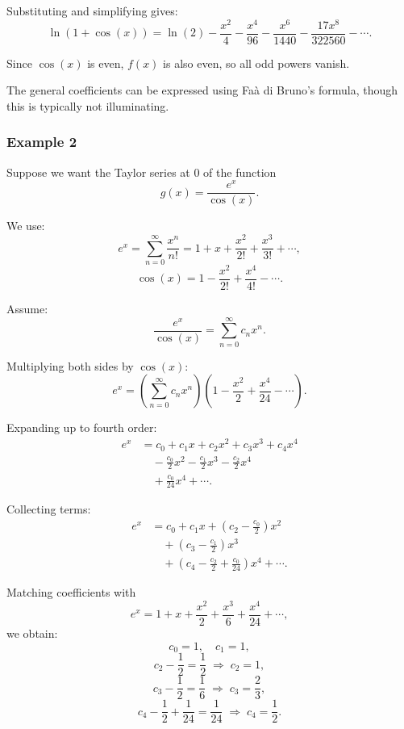 Substituting and simplifying gives:
\[
\ln(1+\cos(x))
= \ln(2)
- \frac{x^2}{4}
- \frac{x^4}{96}
- \frac{x^6}{1440}
- \frac{17x^8}{322560}
- \cdots.
\]

\medskip

Since $\cos(x)$ is even, $f(x)$ is also even, so all odd powers vanish.

\medskip

The general coefficients can be expressed using Faà di Bruno's formula, though this is typically not illuminating.

\subsubsection{Example 2}
\label{sss:exam-5bdd}

Suppose we want the Taylor series at $0$ of the function
\[
g(x) = \frac{e^x}{\cos(x)}.
\]

We use:
\[
e^x = \sum_{n=0}^{\infty} \frac{x^n}{n!}
= 1 + x + \frac{x^2}{2!} + \frac{x^3}{3!} + \cdots,
\]
\[
\cos(x) = 1 - \frac{x^2}{2!} + \frac{x^4}{4!} - \cdots.
\]

Assume:
\[
\frac{e^x}{\cos(x)} = \sum_{n=0}^{\infty} c_n x^n.
\]

Multiplying both sides by $\cos(x)$:
\[
e^x = \left(\sum_{n=0}^{\infty} c_n x^n\right)
\left(1 - \frac{x^2}{2} + \frac{x^4}{24} - \cdots\right).
\]

Expanding up to fourth order:
\[
\begin{aligned}
e^x
&= c_0 + c_1 x + c_2 x^2 + c_3 x^3 + c_4 x^4 \\
&\quad - \frac{c_0}{2} x^2 - \frac{c_1}{2} x^3 - \frac{c_2}{2} x^4 \\
&\quad + \frac{c_0}{24} x^4 + \cdots.
\end{aligned}
\]

Collecting terms:
\[
\begin{aligned}
e^x
&= c_0
+ c_1 x
+ \left(c_2 - \frac{c_0}{2}\right)x^2 \\
&\quad + \left(c_3 - \frac{c_1}{2}\right)x^3 \\
&\quad + \left(c_4 - \frac{c_2}{2} + \frac{c_0}{24}\right)x^4
+ \cdots.
\end{aligned}
\]

Matching coefficients with
\[
e^x = 1 + x + \frac{x^2}{2} + \frac{x^3}{6} + \frac{x^4}{24} + \cdots,
\]
we obtain:
\[
c_0 = 1,\quad c_1 = 1,
\]
\[
c_2 - \frac{1}{2} = \frac{1}{2} \;\Rightarrow\; c_2 = 1,
\]
\[
c_3 - \frac{1}{2} = \frac{1}{6} \;\Rightarrow\; c_3 = \frac{2}{3},
\]
\[
c_4 - \frac{1}{2} + \frac{1}{24} = \frac{1}{24}
\;\Rightarrow\; c_4 = \frac{1}{2}.
\]

